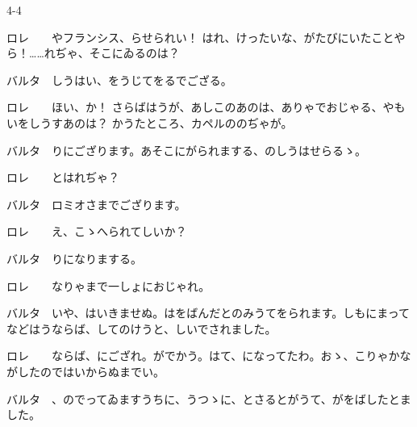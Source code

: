 \documentclass[tate,paper=b6j,jafontsize=9pt]{jlreq}
\begin{document}
\begin{azconvIndented}{4\zw}{-4\zw}

ロレ　　やフランシス、らせられい！ はれ、けったいな、がたびにいたことやら！……れぢゃ、そこにゐるのは？

バルタ　しうはい、をうじてをるでござる。

ロレ　　ほい、か！ さらばはうが、あしこのあのは、ありゃでおじゃる、やもいをしうすあのは？ かうたところ、カペルののぢゃが。

バルタ　りにござります。あそこにがられまする、のしうはせらるゝ。

ロレ　　とはれぢゃ？

バルタ　ロミオさまでござります。

ロレ　　え、こゝへられてしいか？

バルタ　りになりまする。

ロレ　　なりゃまで一しょにおじゃれ。

バルタ　いや、はいきませぬ。はをばんだとのみうてをられます。しもにまってなどはうならば、してのけうと、しいでされました。

ロレ　　ならば、にござれ。がでかう。はて、になってたわ。おゝ、こりゃかながしたのではいからぬまでい。

バルタ　、のでってゐますうちに、うつゝに、とさるとがうて、がをばしたとました。

\end{azconvIndented}
\end{document}
